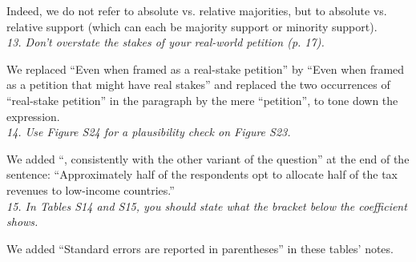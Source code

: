\documentclass[12pt,english]{article}
\begin{document}
Indeed, we do not refer to absolute vs. relative majorities, but to absolute vs. relative support (which can each be majority support or minority support).
~\\


\textit{13. Don’t overstate the stakes of your real-world petition (p. 17).}

We replaced ``Even when framed as a real-stake petition'' by ``Even when framed as a petition that might have real stakes'' and replaced the two occurrences of ``real-stake petition'' in the paragraph by the mere ``petition'', to tone down the expression.
~\\

\textit{14. Use Figure S24 for a plausibility check on Figure S23.}

We added ``, consistently with the other variant of the question'' at the end of the sentence: ``Approximately half of the respondents opt to allocate half of the tax revenues to low-income countries.''
~\\

\textit{15. In Tables S14 and S15, you should state what the bracket below the coefficient shows.}

We added ``Standard errors are reported in parentheses'' in these tables' notes.

\renewcommand{\url}[1]{\href{#1}{Link}} 

\end{document}
